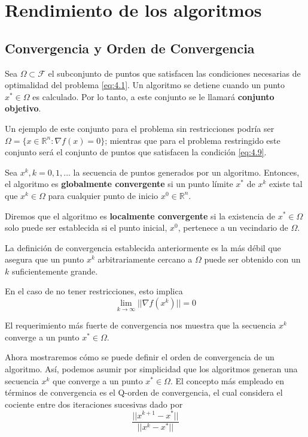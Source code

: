 \section{Rendimiento de los algoritmos}

\subsection{Convergencia y Orden de Convergencia}

\begin{definicion}
Sea $\Omega\subset\mathcal{F}$ el subconjunto de puntos que satisfacen las condiciones necesarias de optimalidad del problema \ref{eq:4.1}. 
Un algoritmo se detiene cuando un punto $x^*\in\Omega$ es calculado. 
Por lo tanto, a este conjunto se le llamará \textbf{conjunto objetivo}.
\end{definicion}

Un ejemplo de este conjunto para el problema sin restricciones podría ser $\Omega = \{x \in\mathbb{R}^n: \nabla f(x) = 0\}$; mientras que para el problema restringido este conjunto será el conjunto de puntos que satisfacen la condición \ref{eq:4.9}.

\begin{definicion}
Sea $x^k, k=0,1,...$ la secuencia de puntos generados por un algoritmo. 
Entonces, el algoritmo es \textbf{globalmente convergente} si un punto límite $x^*$ de $x^k$ existe tal que $x^k\in\Omega$ para cualquier punto de inicio $x^0\in\mathbb{R}^n$.


Diremos que el algoritmo es \textbf{localmente convergente} si la existencia de $x^*\in\Omega$ solo puede ser establecida si el punto inicial, $x^0$, pertenece a un vecindario de $\Omega$.
\end{definicion}

La definición de convergencia establecida anteriormente es la más débil que asegura que un punto $x^k$ arbitrariamente cercano a $\Omega$ puede ser obtenido con un $k$ suficientemente grande.

En el caso de no tener restricciones, esto implica
\begin{equation*}
\lim_{k\xrightarrow{}{}\infty} ||\nabla f(x^k)|| = 0
\end{equation*}

El requerimiento más fuerte de convergencia nos muestra que la secuencia $x^k$ converge a un punto $x^*\in\Omega$.

Ahora mostraremos cómo se puede definir el orden de convergencia de un algoritmo. 
Así, podemos asumir por simplicidad que los algoritmos generan una secuencia $x^k$ que converge a un punto $x^*\in\Omega$. 
El concepto más empleado en términos de convergencia es el Q-orden de convergencia, el cual considera el cociente entre dos iteraciones sucesivas dado por
\begin{equation*}
\dfrac{||x^{k+1} - x^*||}{||x^k - x^*||}
\end{equation*}

